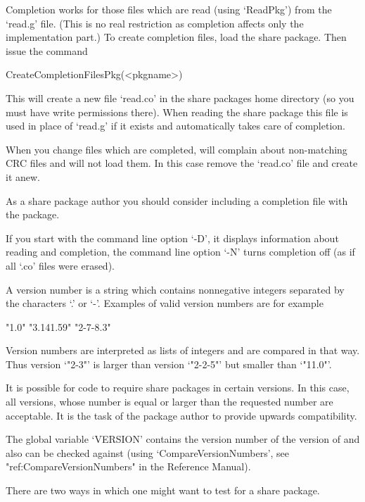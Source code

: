 Completion works for those files which are read (using `ReadPkg')
from the `read.g' file. (This is no real restriction as completion affects
only the implementation part.) To create completion files, load the share
package. Then issue the command

\>CreateCompletionFilesPkg(<pkgname>)

This will create a new file `read.co' in the share packages home directory
(so you must have write permissions there). When reading the share package
this file is used in place of `read.g' if it exists and automatically takes
care of completion.

When you change files which are completed, {\GAP} will complain about
non-matching CRC files and will not load them. In this case remove
the `read.co' file and create it anew.

As a share package author you should consider including a completion file
with the package.

If you start {\GAP} with the command line option `-D', it displays
information about reading and completion, the command line option `-N' turns
completion off (as if all `.co' files were erased).


A version number is a string which contains nonnegative integers separated
by the characters `.' or `-'. Examples of valid version numbers are for
example

\begintt
"1.0"   "3.141.59"  "2-7-8.3"
\endtt

Version numbers are interpreted as lists of integers and are compared in
that way. Thus version `"2-3"' is larger than version `"2-2-5"' but smaller
than `"11.0"'.

It is possible for code to require share packages in certain versions. In
this case, all versions, whose number is equal or larger than the requested
number are acceptable. It is the task of the package author to provide
upwards compatibility.

The global variable `VERSION' contains the version number of the version of
{\GAP} and also can be checked against (using `CompareVersionNumbers', see
"ref:CompareVersionNumbers" in the Reference Manual).



There are two ways in which one might want to test for a share package. 

